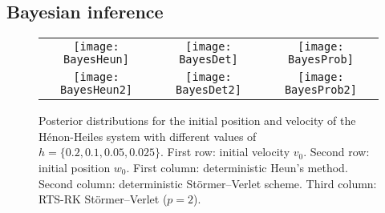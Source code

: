 \documentclass[10pt]{article}
\begin{document}
\subsection{Bayesian inference}\label{sec:BayesianInferenceEx}
\begin{figure}	
	\begin{center}
		
		\vspace{0.1cm}
		\begin{tabular}{ccc}
			\hspace{-0.32cm}\texttt{[image: BayesHeun]}  & \hspace{-0.32cm}\texttt{[image: BayesDet]}  & \hspace{-0.32cm}\texttt{[image: BayesProb]} \\ 
			\texttt{[image: BayesHeun2]} & \texttt{[image: BayesDet2]} & \texttt{[image: BayesProb2]} \\
		\end{tabular}
	\end{center}
	\caption{Posterior distributions for the initial position and velocity of the Hénon-Heiles system with different values of $h = \{0.2, 0.1, 0.05, 0.025\}$. First row: initial velocity $v_0$. Second row: initial position $w_0$. First column: deterministic Heun's method. Second column: deterministic Störmer--Verlet scheme. Third column: RTS-RK Störmer--Verlet ($p=2$).}
	\label{fig:Bayes}
\end{figure}
\end{document}
